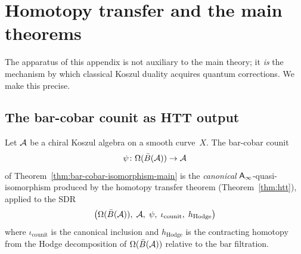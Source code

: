 \section{Homotopy transfer and the main theorems}
\label{sec:htt-main-theorems}

The apparatus of this appendix is not auxiliary to the main
theory; it \emph{is} the mechanism by which classical Koszul duality
acquires quantum corrections.  We make this precise.

\subsection{The bar-cobar counit as HTT output}

\begin{theorem}
\label{thm:bar-cobar-htt}
Let $\mathcal{A}$ be a chiral Koszul algebra on a smooth curve~$X$.
The bar-cobar counit
\[
\psi \colon \Omega(\bar{B}(\mathcal{A})) \to \mathcal{A}
\]
of Theorem~\textup{\ref{thm:bar-cobar-isomorphism-main}} is the
\emph{canonical} $\mathsf{A}_{\infty}$-quasi-isomorphism produced by the homotopy
transfer theorem (Theorem~\ref{thm:htt}), applied to the SDR
\[
\bigl(\Omega(\bar{B}(\mathcal{A})),\; \mathcal{A},\; \psi,\; \iota_{\mathrm{counit}},\;
h_{\mathrm{Hodge}}\bigr)
\]
where $\iota_{\mathrm{counit}}$ is the canonical inclusion and
$h_{\mathrm{Hodge}}$ is the contracting homotopy from the
Hodge decomposition of $\Omega(\bar{B}(\mathcal{A}))$ relative to the bar
filtration.
\end{theorem}

